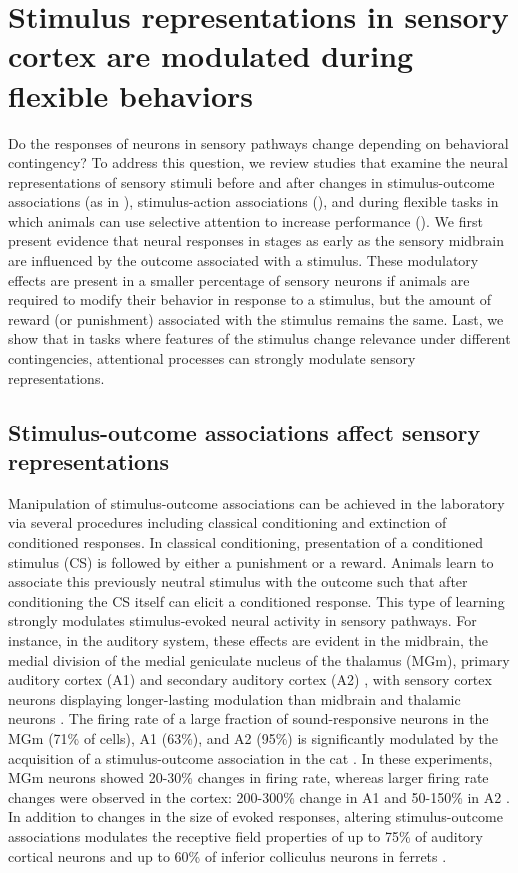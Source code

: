 \section{Stimulus representations in sensory cortex are modulated during flexible behaviors}

Do the responses of neurons in sensory pathways change depending on behavioral contingency? 
%
To address this question, we review studies that examine the neural representations of sensory stimuli before and after changes in stimulus-outcome associations (as in \fig{\StimOutcome}), stimulus-action associations (\fig{\StimAction}), and during flexible tasks in which animals can use selective attention to increase performance (\fig{\FeatureRelevance}).
%
We first present evidence that neural responses in stages as early as the sensory midbrain are influenced by the outcome associated with a stimulus.
%
These modulatory effects are present in a smaller percentage of sensory neurons if animals are required to modify their behavior in response to a stimulus, but the amount of reward (or punishment) associated with the stimulus remains the same.
%	
Last, we show that in tasks where features of the stimulus change relevance under different contingencies, attentional processes can strongly modulate sensory representations.

\subsection{Stimulus-outcome associations affect sensory representations}

Manipulation of stimulus-outcome associations can be achieved in the laboratory via several procedures including classical conditioning and extinction of conditioned responses. In classical conditioning, presentation of a conditioned stimulus (CS) is followed by either a punishment or a reward. Animals learn to associate this previously neutral stimulus with the outcome such that after conditioning the CS itself can elicit a conditioned response. This type of learning strongly modulates stimulus-evoked neural activity in sensory pathways. For instance, in the auditory system, these effects are evident in the midbrain, the medial division of the medial geniculate nucleus of the thalamus (MGm), primary auditory cortex (A1) and secondary auditory cortex (A2) \citep[reviewed in][]{Weinberger1987, Weinberger1993}, with sensory cortex neurons displaying longer-lasting modulation than midbrain and thalamic neurons \citep{Suga2003, Weinberger2007}. The firing rate of a large fraction of sound-responsive neurons in the MGm (71\% of cells), A1 (63\%), and A2 (95\%) is significantly modulated by the acquisition of a stimulus-outcome association in the cat \citep{Ryugo1978, Weinberger1984, Diamond1984}. In these experiments, MGm neurons showed 20-30\% changes in firing rate, whereas larger firing rate changes were observed in the cortex: 200-300\% change in A1 and 50-150\% in A2 \citep{Ryugo1978, Weinberger1984, Diamond1984}. In addition to changes in the size of evoked responses, altering stimulus-outcome associations modulates the receptive field properties of up to 75\% of auditory cortical neurons \citep{Fritz2003} and up to 60\% of inferior colliculus neurons in ferrets \citep{Slee2015}. 

